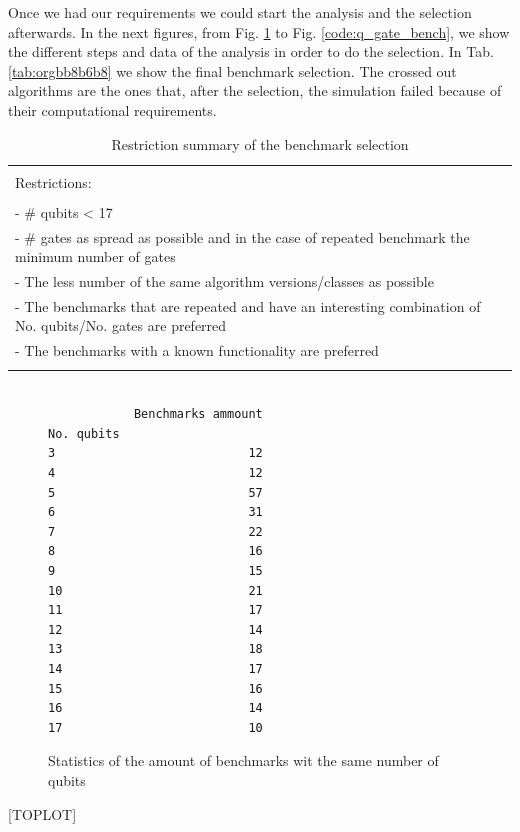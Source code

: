 \documentclass{book}
\begin{document}
Once we had our requirements we could start the analysis and the selection afterwards.
In the next figures, from Fig. \ref{code:no_q_statistics} to Fig. \ref{code:q_gate_bench}, we show the different steps and data of the analysis in order to do the selection.
In Tab. \ref{tab:orgbb8b6b8} we show the final benchmark selection.
The crossed out algorithms are the ones that, after the selection, the simulation failed because of their computational requirements.
\begin{table}[htbp]
\caption{\label{tab:org3a771c7}
Restriction summary of the benchmark selection}
\centering
\begin{tabular}{|l|}
\hline
\\
Restrictions:\\
\\
- \# qubits < 17\\
- \# gates as spread as possible and in the case of repeated benchmark the minimum number of gates\\
- The less number of the same algorithm versions/classes as possible\\
- The benchmarks that are repeated and have an interesting combination of No. qubits/No. gates are  preferred\\
- The benchmarks with a known functionality are preferred\\
\\
\hline
\end{tabular}
\end{table}

\begin{figure}
\centering

\begin{verbatim}

            Benchmarks ammount
No. qubits
3                           12
4                           12
5                           57
6                           31
7                           22
8                           16
9                           15
10                          21
11                          17
12                          14
13                          18
14                          17
15                          16
16                          14
17                          10

\end{verbatim}


\label{code:no_q_statistics}
\caption{Statistics of the amount of benchmarks wit the same number of qubits}
\end{figure}
[TOPLOT]
\end{document}
